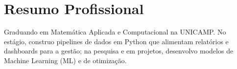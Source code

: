 \renewcommand{\myTitle}{Análise de Dados \, $|$ \, Ciência de Dados \, $|$ \, Engenharia de Dados}
\resumeheader

\section{Resumo Profissional}
\resumeSubHeadingListStart
    \item \small{Graduando em Matemática Aplicada e Computacional na UNICAMP. No estágio, construo pipelines de dados em Python que alimentam relatórios e dashboards para a gestão; na pesquisa e em projetos, desenvolvo modelos de Machine Learning (ML) e de otimização.}
\resumeSubHeadingListEnd
